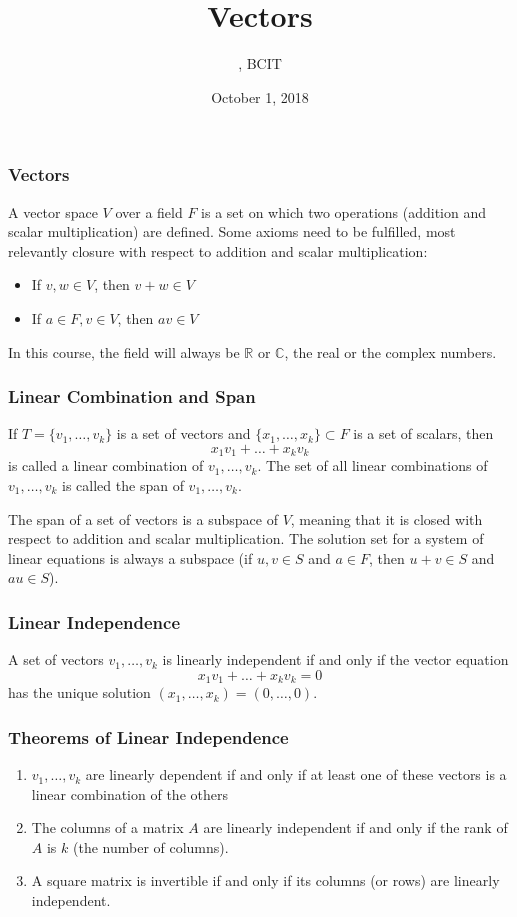 \documentclass[xcolor=dvipsnames]{beamer}
\title{Vectors}
\subtitle{{\CourseNumber}, BCIT}
\author{\CourseName}
\date{October 1, 2018}
\begin{document}
\begin{frame}
  \titlepage
\end{frame}

\begin{frame}
  \frametitle{Vectors}
  A vector space $V$ over a field $F$ is a set on which two operations
  (addition and scalar multiplication) are defined. Some axioms need
  to be fulfilled, most relevantly \alert{closure} with respect to
  addition and scalar multiplication:
  \begin{itemize}
  \item If $v,w\in{}V$, then $v+w\in{}V$
  \item If $a\in{}F,v\in{}V$, then $av\in{}V$
  \end{itemize}
  In this course, the field will always be $\mathbb{R}$ or
  $\mathbb{C}$, the real or the complex numbers.
\end{frame}

\begin{frame}
  \frametitle{Linear Combination and Span}
  If $T=\{v_{1},{\ldots},v_{k}\}$ is a set of vectors and
  $\{x_{1},{\ldots},x_{k}\}\subset{}F$ is a set of scalars, then
  \begin{equation}
    \label{eq:aiveatah}
    x_{1}v_{1}+{\ldots}+x_{k}v_{k}
  \end{equation}
  is called a \alert{linear combination} of $v_{1},{\ldots},v_{k}$.
  The set of all linear combinations of $v_{1},{\ldots},v_{k}$ is
  called the \alert{span} of $v_{1},{\ldots},v_{k}$.

  \medskip

  The span of a set of vectors is a \alert{subspace} of $V$, meaning
  that it is closed with respect to addition and scalar
  multiplication. The solution set for a system of linear equations is
  always a subspace (if $u,v\in{}S$ and $a\in{}F$, then $u+v\in{}S$
  and $au\in{}S$).
\end{frame}

\begin{frame}
  \frametitle{Linear Independence}
  A set of vectors $v_{1},{\ldots},v_{k}$ is \alert{linearly
    independent} if and only if the vector equation
  \begin{equation}
    \label{eq:wohsiete}
    x_{1}v_{1}+{\ldots}+x_{k}v_{k}=0    
  \end{equation}
  has the unique solution $(x_{1},{\ldots},x_{k})=(0,{\ldots},0)$.
\end{frame}

\begin{frame}
  \frametitle{Theorems of Linear Independence}
  \begin{enumerate}
  \item $v_{1},{\ldots},v_{k}$ are linearly dependent if and only if
    at least one of these vectors is a linear combination of the
    others
  \item The columns of a matrix $A$ are linearly independent if and
    only if the rank of $A$ is $k$ (the number of columns).
  \item A square matrix is invertible if and only if its columns (or
    rows) are linearly independent.
  \end{enumerate}
\end{frame}
\end{document}
